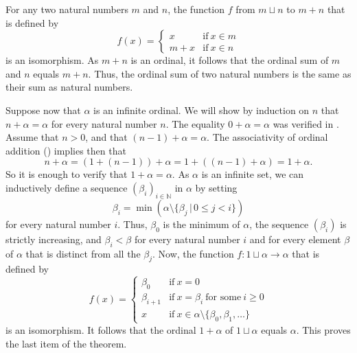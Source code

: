 \documentclass{article}
\begin{document}
For any two natural numbers \(m\) and \(n\), the function \(f\) from
\(m \sqcup n\) to \(m + n\) that is defined by
\begin{displaymath}
  f(x) =
  \begin{cases}
    x & \text{if} ~ x \in m \\
    m + x & \text{if} ~ x \in n
  \end{cases}
\end{displaymath}
is an isomorphism.  As \(m + n\) is an ordinal, it follows that the
ordinal sum of \(m\) and \(n\) equals \(m + n\).  Thus, the ordinal
sum of two natural numbers is the same as their sum as natural
numbers.

Suppose now that \(\alpha\) is an infinite ordinal.  We will show by
induction on \(n\) that \(n + \alpha = \alpha\) for every natural
number \(n\).  The equality \(0 + \alpha = \alpha\) was verified in
.  Assume that \(n > 0\), and that
\((n-1) + \alpha = \alpha\).  The associativity of ordinal addition
() implies then that
\begin{displaymath}
  n + \alpha =
  (1 + (n-1)) + \alpha =
  1 + ((n-1) + \alpha) =
  1 + \alpha.
\end{displaymath}
So it is enough to verify that \(1 + \alpha = \alpha\).  As \(\alpha\)
is an infinite set, we can inductively define a sequence
\((\beta_i)_{i \in \mathbb{N}}\) in \(\alpha\) by setting
\begin{displaymath}
  \beta_i =
  \min (\alpha \setminus \{\beta_j \,\vert\, 0 \leq j < i\})
\end{displaymath}
for every natural number \(i\).  Thus, \(\beta_0\) is the minimum of
\(\alpha\), the sequence \((\beta_i)\) is strictly increasing, and
\(\beta_i < \beta\) for every natural number \(i\) and for every
element \(\beta\) of \(\alpha\) that is distinct from all the
\(\beta_j\).  Now, the function \(f : 1 \sqcup \alpha \to \alpha\)
that is defined by
\begin{displaymath}
  f(x) =
  \begin{cases}
    \beta_0
    & \text{if} ~ x = 0 \\
    \beta_{i+1}
    & \text{if} ~ x = \beta_i ~ \text{for some} ~ i \geq 0 \\
    x
    & \text{if} ~ x \in \alpha \setminus \{\beta_0, \beta_1, \dotsc\}
  \end{cases}
\end{displaymath}
is an isomorphism.  It follows that the ordinal \(1 + \alpha\) of
\(1 \sqcup \alpha\) equals \(\alpha\).  This proves the last item of
the theorem.
\end{document}
